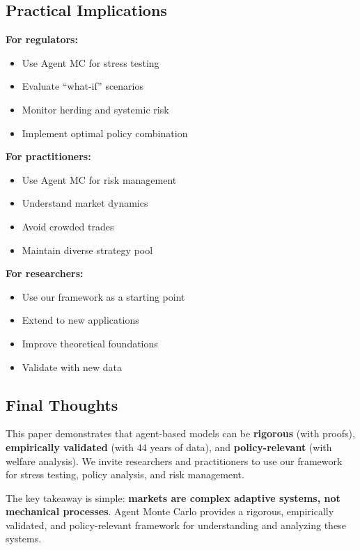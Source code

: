 \subsection{Practical Implications}

\textbf{For regulators:}

\begin{itemize}
    \item Use Agent MC for stress testing
    \item Evaluate ``what-if'' scenarios
    \item Monitor herding and systemic risk
    \item Implement optimal policy combination
\end{itemize}

\textbf{For practitioners:}

\begin{itemize}
    \item Use Agent MC for risk management
    \item Understand market dynamics
    \item Avoid crowded trades
    \item Maintain diverse strategy pool
\end{itemize}

\textbf{For researchers:}

\begin{itemize}
    \item Use our framework as a starting point
    \item Extend to new applications
    \item Improve theoretical foundations
    \item Validate with new data
\end{itemize}

\subsection{Final Thoughts}

This paper demonstrates that agent-based models can be \textbf{rigorous} (with proofs), \textbf{empirically validated} (with 44 years of data), and \textbf{policy-relevant} (with welfare analysis). We invite researchers and practitioners to use our framework for stress testing, policy analysis, and risk management.

The key takeaway is simple: \textbf{markets are complex adaptive systems, not mechanical processes}. Agent Monte Carlo provides a rigorous, empirically validated, and policy-relevant framework for understanding and analyzing these systems.

